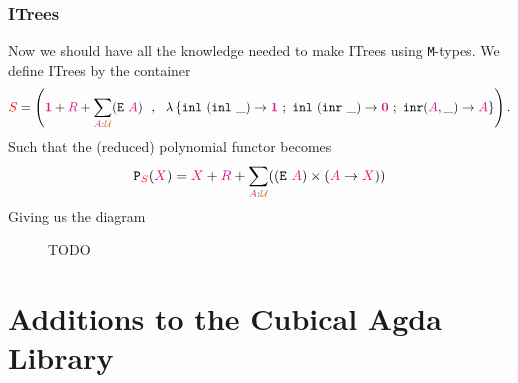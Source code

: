 \documentclass[twoside,11pt,openright]{report}
\newcommand*{\type}[1]{\textcolor{magenta!90!black}{#1}}
\newcommand*{\container}[1]{\textcolor{red}{#1}}
\newcommand*{\universe}[1]{\textcolor{orange!80!black}{#1}}
\newcommand*{\unit}{\type{\textbf{1}}}
\newcommand*{\empt}{\type{\textbf{0}}}
\newcommand*{\function}[1]{\textcolor{blue!60!black}{\ensuremath{\mathtt{#1}}}}
\newcommand*{\typeformer}[1]{\ensuremath{\mathtt{#1}}}
\newcommand*{\functor}[1]{\ensuremath{\mathbf{\mathtt{#1}}}}
\begin{document}
\subsection{ITrees}
Now we should have all the knowledge needed to make ITrees using \texttt{M}-types. We define ITrees by the container
\begin{equation}
  \container{S} = \left( \unit+\type{R}+\sum_{\type{A}:\universe{\mathcal{U}}} (\typeformer{E}~\type{A}) ~~,~~ \lambda\left\{ \texttt{inl}~(\texttt{inl}~\_) \rightarrow \unit ~;~ \texttt{inl}~(\texttt{inr}~\_) \rightarrow \empt ~;~ \texttt{inr} (\type{A},\_)  \rightarrow \type{A} \right\} \right).
\end{equation}
Such that the (reduced) polynomial functor becomes
\begin{equation}
  \functor{P}_{\container{S}}(\type{X}) = \type{X} + \type{R} + \sum_{\type{A} : \universe{\mathcal{U}}} ((\typeformer{E}~\type{A}) \times (\type{A} \rightarrow \type{X}))
\end{equation}
Giving us the diagram
\begin{figure}[h]
  \centering
  \caption{TODO}
\end{figure}


\chapter{Additions to the Cubical Agda Library}
\end{document}
